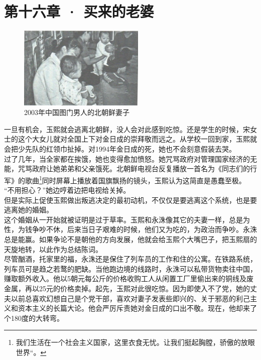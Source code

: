 \fancyhead[RO]{\thepage}
\fancyhead[LE]{\thepage}
\fancyfoot[LE,RO]{}
\fancyfoot[LO,CE]{}
\fancyfoot[CO,RE]{}
\chapter*{第十六章 · 买来的老婆}
\begin{figure}[!htbp]
\centering
\includegraphics[width=6cm]{./Chapters/Images/16.jpg}
\caption*{2003年中国图门男人的北朝鲜妻子}
\end{figure}


一旦有机会，玉熙就会逃离北朝鲜，没人会对此感到吃惊。还是学生的时候，宋女士的这个大女儿就对全国上下对金日成的崇拜敬而远之。从学校一回到家，玉熙就会把少先队的红领巾扯掉。对1994年金日成的死，她也不会刻意假装去哭。\\

过了几年，当全家都在挨饿，她也变得愈加愤怒。她咒骂政府对管理国家经济的无能，咒骂政府让她弟弟和父亲饿死。北朝鲜电视台反复播放一首名为《同志们的行军》的歌曲\footnote{我们生活在一个社会主义国家，这里衣食无忧。让我们挺起胸膛，骄傲的放眼世界“。}同时屏幕上播放着国旗飘扬的镜头，玉熙认为这简直是愚蠢至极。\\

“不用担心？”她边哼着边把电视给关掉。\\

但是实际上促使玉熙做出叛逃决定的最初动机，不仅仅是要逃离这个系统，也是要逃离她的婚姻。\\

这个婚姻从一开始就被证明是过于草率。玉熙和永洙像其它的夫妻一样，总是为性，为钱争吵不休，后来当日子艰难的时候，他们又为吃的，为政治而争吵。永洙总是能赢。如果争论不是朝他的方向发展，他就会给玉熙个大嘴巴子，把玉熙扇的天旋地转，以此作为总结陈词。\\

尽管酗酒，托家里的福，永洙还是保住了列车员的工作和住的公寓。在铁路系统，列车员可是趋之若鹜的肥缺。当他跑边境的线路时，永洙可以私带货物卖往中国，赚取额外收入。他以5朝元每公斤的价格收购工人从闲置工厂里偷出来的铜线及废金属，再以25元的价格卖掉。起先，玉熙对此很吃惊。因为即使入不了党，她的丈夫以前总喜欢幻想自己是个党干部，喜欢对妻子发表些即兴的、关于邪恶的利己主义和资本主义的长篇大论。他会严厉斥责她对金日成的口出不敬。现在，他却来了个180度的大转弯。\\

